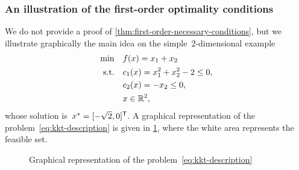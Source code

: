 \subsubsection{An illustration of the first-order optimality conditions}

We do not provide a proof of \cref{thm:first-order-necessary-conditions}, but we illustrate graphically the main idea on the simple~$2$-dimensional example
\begin{subequations}
    \label{eq:kkt-description}
    \begin{align}
        \min        & \quad \obj(\iter) = x_1 + x_2\\
        \text{s.t.} & \quad \con{1}(\iter) = x_1^2 + x_2^2 - 2 \le 0, \label{eq:kkt-description-c1}\\
                    & \quad \con{2}(\iter) = -x_2 \le 0, \label{eq:kkt-description-c2}\\
                    & \quad \iter \in \R^2, \nonumber
    \end{align}
\end{subequations}
whose solution is~$\iter[\ast] = [-\sqrt{2}, 0]^{\T}$.
A graphical representation of the problem~\cref{eq:kkt-description} is given in \cref{fig:kkt-description}, where the white area represents the feasible set.

\begin{figure}[ht]
    \centering
    \caption{Graphical representation of the problem~\cref{eq:kkt-description}}
    \label{fig:kkt-description}
\end{figure}

